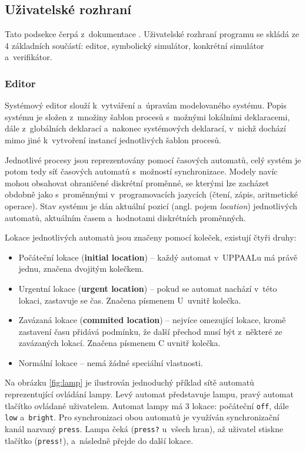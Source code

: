 \subsection{Uživatelské rozhraní} \label{uppaal_gui}
Tato podsekce čerpá z~dokumentace \cite{uppaal_doc}. Uživatelské rozhraní programu se skládá ze 4 základních součástí: editor, symbolický simulátor, konkrétní simulátor a~verifikátor.

\subsubsection{Editor}
Systémový editor slouží k~vytváření a~úpravám modelovaného systému. Popis systému je složen z~množiny šablon procesů s~možnými lokálními deklaracemi, dále z~globálních deklarací a~nakonec systémových deklarací, v~nichž dochází mimo jiné k~vytvoření instancí jednotlivých šablon procesů.

Jednotlivé procesy jsou reprezentovány pomocí časových automatů, celý systém je potom tedy síť časových automatů s~možností synchronizace. Modely navíc mohou obsahovat ohraničené diskrétní proměnné, se kterými lze zacházet obdobně jako s~proměnnými v~programovacích jazycích (čtení, zápis, aritmetické operace). Stav systému je dán aktuální pozicí (angl. pojem \textit{location}) jednotlivých automatů, aktuálním časem a~hodnotami diskrétních proměnných.

Lokace jednotlivých automatů jsou značeny pomocí koleček, existují čtyři druhy:
\begin{itemize}
    \item Počáteční lokace (\textbf{initial location}) -- každý automat v~UPPAALu má právě jednu, značena dvojitým kolečkem.
    \item Urgentní lokace (\textbf{urgent location}) -- pokud se automat nachází v~této lokaci, zastavuje se čas. Značena písmenem U~uvnitř kolečka.
    \item Zavázaná lokace (\textbf{commited location}) -- nejvíce omezující lokace, kromě zastavení času přidává podmínku, že další přechod musí být z~některé ze zavázaných lokací. Značena písmenem C uvnitř kolečka.
    \item Normální lokace -- nemá žádné speciální vlastnosti.
\end{itemize}

Na obrázku \ref{fig:lamp} je ilustrován jednoduchý příklad sítě automatů reprezentující ovládání lampy. Levý automat představuje lampu, pravý automat tlačítko ovládané uživatelem. Automat lampy má 3 lokace: počáteční \texttt{off}, dále \texttt{low} a~\texttt{bright}. Pro synchronizaci obou automatů je využíván synchronizační kanál nazvaný \texttt{press}. Lampa čeká (\texttt{press?} u~všech hran), až uživatel stiskne tlačítko (\texttt{press!}), a~následně přejde do další lokace.

